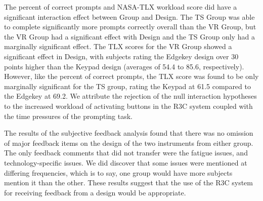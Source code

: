 The percent of correct prompts and NASA-TLX workload score did have a significant interaction effect between Group and Design.
The TS Group was able to complete significantly more prompts correctly overall than the VR Group, but the VR Group had a significant effect with Design and the TS Group only had a marginally significant effect.
The TLX scores for the VR Group showed a significant effect in Design, with subjects rating the Edgekey design over 30 points higher than the Keypad design (averages of 54.4 to 85.6, respectively).
However, like the percent of correct prompts, the TLX score was found to be only marginally significant for the TS group, rating the Keypad at 61.5 compared to the Edgekey at 69.2.
We attribute the rejection of the null interaction hypotheses to the increased workload of activating buttons in the R3C system coupled with the time pressures of the prompting task.

The results of the subjective feedback analysis found that there was no omission of major feedback items on the design of the two instruments from either group.
The only feedback comments that did not transfer were the fatigue issues, and technology-specific issues.
We did discover that some issues were mentioned at differing frequencies, which is to say, one group would have more subjects mention it than the other.
These results suggest that the use of the R3C system for receiving feedback from a design would be appropriate.
